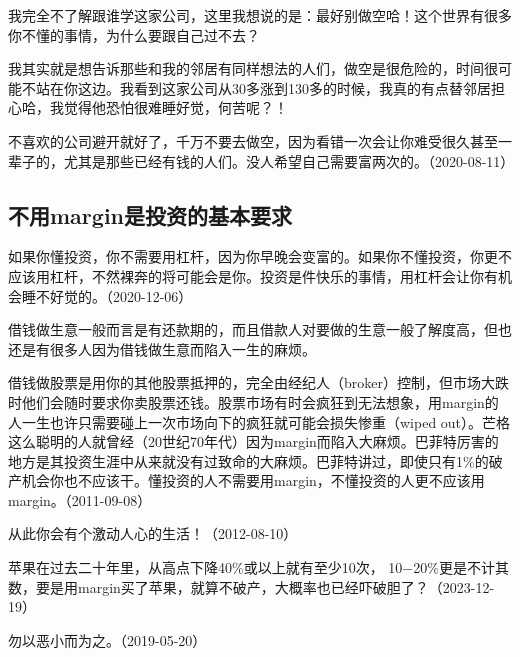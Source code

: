 我完全不了解跟谁学这家公司，这里我想说的是：最好别做空哈！这个世界有很多你不懂的事情，为什么要跟自己过不去？

我其实就是想告诉那些和我的邻居有同样想法的人们，做空是很危险的，时间很可能不站在你这边。我看到这家公司从30多涨到130多的时候，我真的有点替邻居担心哈，我觉得他恐怕很难睡好觉，何苦呢？！

不喜欢的公司避开就好了，千万不要去做空，因为看错一次会让你难受很久甚至一辈子的，尤其是那些已经有钱的人们。没人希望自己需要富两次的。（2020-08-11）

\subsection{不用margin是投资的基本要求}

如果你懂投资，你不需要用杠杆，因为你早晚会变富的。如果你不懂投资，你更不应该用杠杆，不然裸奔的将可能会是你。投资是件快乐的事情，用杠杆会让你有机会睡不好觉的。（2020-12-06）


借钱做生意一般而言是有还款期的，而且借款人对要做的生意一般了解度高，但也还是有很多人因为借钱做生意而陷入一生的麻烦。

借钱做股票是用你的其他股票抵押的，完全由经纪人（broker）控制，但市场大跌时他们会随时要求你卖股票还钱。股票市场有时会疯狂到无法想象，用margin的人一生也许只需要碰上一次市场向下的疯狂就可能会损失惨重（wiped out）。芒格这么聪明的人就曾经（20世纪70年代）因为margin而陷入大麻烦。巴菲特厉害的地方是其投资生涯中从来就没有过致命的大麻烦。巴菲特讲过，即使只有1\%的破产机会你也不应该干。懂投资的人不需要用margin，不懂投资的人更不应该用margin。（2011-09-08）


从此你会有个激动人心的生活！（2012-08-10）


苹果在过去二十年里，从高点下降40\%或以上就有至少10次， 10\( - \)20\%更是不计其数，要是用margin买了苹果，就算不破产，大概率也已经吓破胆了？（2023-12-19）


勿以恶小而为之。（2019-05-20）


